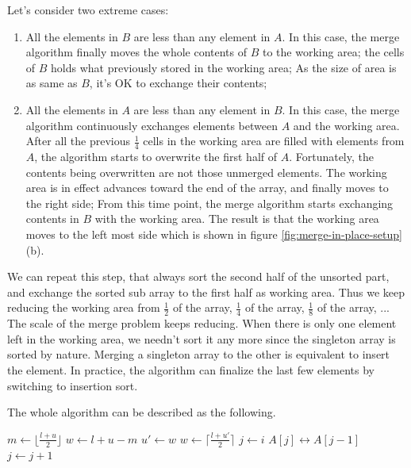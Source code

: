 \documentclass[b5paper]{article}
\begin{document}
Let's consider two extreme cases:

\begin{enumerate}
\item All the elements in $B$ are less than any element in $A$. In this case, the merge algorithm
finally moves the whole contents of $B$ to the working area; the cells of $B$ holds what previously
stored in the working area; As the size of area is as same as $B$, it's OK to exchange their contents;
\item All the elements in $A$ are less than any element in $B$. In this case, the merge algorithm
continuously exchanges elements between $A$ and the working area. After all the previous $\frac{1}{4}$
cells in the working area are filled with elements from $A$, the algorithm starts to overwrite the
first half of $A$. Fortunately, the contents being overwritten are not those unmerged elements.
The working area is in effect advances toward the end of the array, and finally moves to the right
side; From this time point, the merge algorithm starts exchanging contents in $B$ with the working area.
The result is that the working area moves to the left most side which is shown in figure \ref{fig:merge-in-place-setup} (b).
\end{enumerate}

We can repeat this step, that always sort the second half of the unsorted part, and exchange
the sorted sub array to the first half as working area. Thus we keep reducing the working area
from $\frac{1}{2}$ of the array, $\frac{1}{4}$
of the array, $\frac{1}{8}$ of the array, ... The scale of the merge problem keeps reducing.
When there is only one element left in the working area, we needn't sort it any more since
the singleton array is sorted by nature. Merging a singleton array to the other is equivalent
to insert the element. In practice, the algorithm can finalize the last few
elements by switching to insertion sort.

The whole algorithm can be described as the following.

\begin{algorithmic}[1]
    \State $m \gets \lfloor \frac{l + u}{2} \rfloor$
    \State $w \gets l + u - m$
    \State {} 
      \State $u' \gets w$
      \State $w \gets \lceil \frac{l + u'}{2} \rceil$ 
      \State {} 
      \State {}
    \EndWhile
     
      \State $j \gets i$
        \State {} $A[j] \leftrightarrow A[j-1]$
        \State $j \gets j + 1$
      \EndWhile
    \EndFor
  \EndIf
\EndProcedure
\end{algorithmic}
\end{document}
